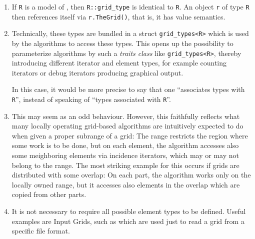     \begin{enumerate}
    \item       {}
      If {\tt  R} is a model of
      ,
      then {\tt  R::grid\_type} is identical to {\tt  R}.
      An object {\tt  r} of type {\tt R} 
      then references itself via {\tt  r.TheGrid()}, 
      that is, it has value semantics.
          
      \item   {}
        Technically, these types are bundled in a struct {\tt  grid\_types<R>}
      which is used by the algorithms to access these types. This opens up the possibility
      to parameterize algorithms by such a {\em  traits class} like {\tt  grid\_types<R>},
      thereby introducing different iterator and element types, for example counting iterators
      or debug iterators producing graphical output.
    
      In this case, it would be more precise to say that one 
      ``associates types with {\tt  R}'', 
      instead of speaking of ``types associated with {\tt  R}''.

      
      \item {}
        This may seem as an odd behaviour. However, this faithfully reflects what many
      locally operating grid-based algorithms are intuitively expected to do when
      given a proper subrange of a grid: The range restricts the region where some
      work is to be done, but on each element, the algorithm accesses also some
      meighboring elements via incidence iterators, which may or may not belong to the
      range. The most striking example for this occurs if grids are distributed with
      some overlap: On each part, the algorithm works only on the locally owned range, 
      but it accesses also elements in the overlap which are copied from other parts.

     
      \item 
        It is not necessary to require all possible element types to be defined.
      Useful examples are Input Grids, 
      such as   
      which are used just to read a grid from
      a specific file format.
    \end{enumerate}

     ~
     ~
     ~


